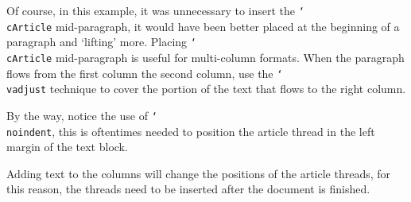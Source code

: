 \documentclass{article}
\providecommand{\cs}[1]{\texttt{\char`\\#1}}
\begin{document}
\begin{multicols}{2}
Of course, in this example, it was unnecessary to insert the \cs{cArticle}
mid-paragraph, it would have been better placed at the beginning of a
paragraph and `lifting' more. Placing \cs{cArticle} mid-paragraph is useful
for multi-column formats. When the paragraph flows from the first column the
second column, use the \cs{vadjust} technique to cover the portion of the
text that flows to the right column.

By the way, notice the use of \cs{noindent}, this is
oftentimes needed to position the article thread in the left margin of the
text block.
\end{multicols}

\noindent
Adding text to the columns will change the positions of the article threads, for
this reason, the threads need to be inserted after the document is finished.
\end{document}
